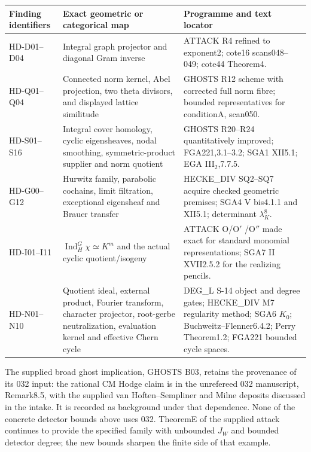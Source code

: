 \begin{longtable}{p{}p{}p{}}
\toprule
Finding identifiers & Exact geometric or categorical map & Programme and text locator\\
\midrule
\endhead
HD-D01--D04 & Integral graph projector and diagonal Gram inverse &
ATTACK R4 refined to exponent2; cote16 scans048--049; cote44 Theorem4.\\[4pt]
HD-Q01--Q04 & Connected norm kernel, Abel projection, two theta divisors,
and displayed lattice similitude &
GHOSTS R12 scheme with corrected full norm fibre; bounded representatives
for conditionA, scan050.\\[4pt]
HD-S01--S16 & Integral cover homology, cyclic eigensheaves, nodal
smoothing, symmetric-product supplier and norm quotient &
GHOSTS R20--R24 quantitatively improved; FGA221,3.1--3.2;
SGA1 XII5.1; EGA III$_2$,7.7.5.\\[4pt]
HD-G00--G12 & Hurwitz family, parabolic cochains, limit filtration,
exceptional eigensheaf and Brauer transfer &
HECKE\_DIV SQ2--SQ7 acquire checked geometric premises;
SGA4 V bis4.1.1 and XII5.1; determinant $\lambda_K^8$.\\[4pt]
HD-I01--I11 & $\operatorname{Ind}_H^G\chi\simeq K^m$ and the actual
cyclic quotient/isogeny &
ATTACK O/O$'$ /O$''$ made exact for standard monomial representations;
SGA7 II XVII2.5.2 for the realizing pencils.\\[4pt]
HD-N01--N10 & Quotient ideal, external product, Fourier transform,
character projector, root-gerbe neutralization, evaluation kernel
and effective Chern cycle &
DEG\_L S-14 object and degree gates; HECKE\_DIV M7 regularity
method; SGA6 $K_0$; Buchweitz--Flenner6.4.2; Perry Theorem1.2;
FGA221 bounded cycle spaces.\\
\bottomrule
\end{longtable}

The supplied broad ghost implication, GHOSTS B03, retains the provenance
of its 032 input: the rational CM Hodge claim is in the unrefereed
032 manuscript, Remark8.5, with the supplied van Hoften--Sempliner and
Milne deposits discussed in the intake. It is recorded as background
under that dependence. None of the concrete detector bounds above
uses 032. TheoremE of the supplied attack continues to provide the
specified family with unbounded $J_W$ and bounded detector degree;
the new bounds sharpen the finite side of that example.
